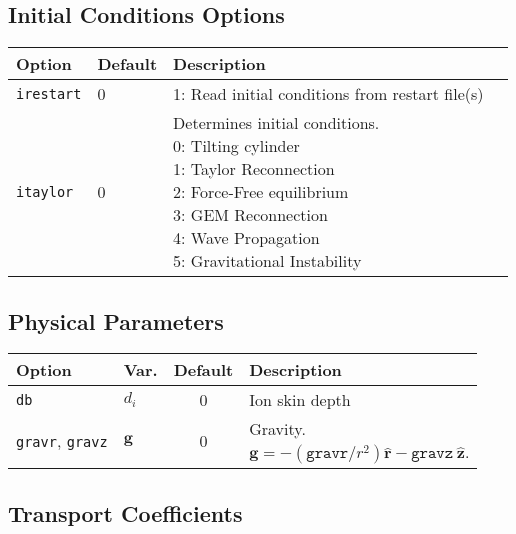 \documentclass[letterpaper]{book}
\renewcommand{\vec}[1]{\ensuremath{\mathbf{#1}}}
\newcommand{\uvec}[1]{\ensuremath{\vec{\hat{#1}}}}
\begin{document}
\subsection{Initial Conditions Options}

\begin{tabular}{llll}
  \textbf{Option}&\textbf{Default}&\textbf{Description}\\
  \hline
  \texttt{irestart} & 0 & 1: Read initial conditions from restart file(s)\\
  \texttt{itaylor}  & 0 & \parbox[t]{2in}{Determines initial
  conditions.\\
  0: Tilting cylinder\\
  1: Taylor Reconnection\\
  2: Force-Free equilibrium\\
  3: GEM Reconnection\\
  4: Wave Propagation\\
  5: Gravitational Instability\\}
\end{tabular}



\subsection{Physical Parameters}

\begin{tabular}{llcl}
  \textbf{Option}&\textbf{Var.}&\textbf{Default}&\textbf{Description}\\
  \hline
  \texttt{db}     & $d_i$   & 0   & Ion skin depth\\
  \texttt{gravr}, \texttt{gravz} & \vec{g} & 0 & \parbox[t]{1.8in}{Gravity.\\
                       $\vec{g} = -(\mathtt{gravr}/r^2) \uvec{r} 
                                  - \mathtt{gravz}\ \uvec{z}$.}
\end{tabular}


\subsection{Transport Coefficients}
\end{document}
